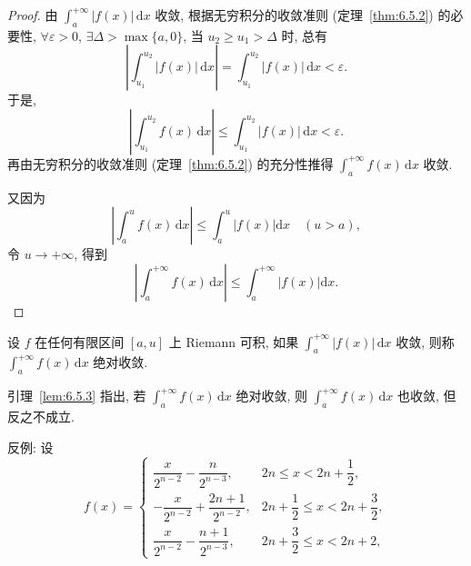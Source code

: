 \begin{proof}
由 $\int_{a}^{+\infty}|f(x)|\,\mathrm{d}x$ 收敛, 根据无穷积分的收敛准则 (定理~\ref{thm:6.5.2}) 的必要性, $\forall\varepsilon>0$, $\exists\Delta>\max\{a,0\}$, 当 $u_{2}\geqslant u_{1}>\Delta$ 时, 总有
\[
\left|\int_{u_{1}}^{u_{2}}|f(x)|\,\mathrm{d}x\right|=\int_{u_{1}}^{u_{2}}|f(x)|\,\mathrm{d}x<\varepsilon.
\]
于是,
\[
\left|\int_{u_{1}}^{u_{2}}f(x)\,\mathrm{d}x\right|\leqslant\int_{u_{1}}^{u_{2}}|f(x)|\,\mathrm{d}x<\varepsilon.
\]
再由无穷积分的收敛准则 (定理~\ref{thm:6.5.2}) 的充分性推得 $\int_{a}^{+\infty}f(x)\,\mathrm{d}x$ 收敛.

又因为
\[
\left|\int_{a}^{u}f(x)\,\mathrm{d}x\right|\leqslant\int_{a}^{u}\left|f(x)\right|\mathrm{d}x\quad(u>a),
\]
令 $u\to+\infty$, 得到
\[
\left|\int_{a}^{+\infty}f(x)\,\mathrm{d}x\right|\leqslant\int_{a}^{+\infty}\left|f(x)\right|\mathrm{d}x.
\]
\end{proof}

\begin{definition}\label{def:6.5.3}
设 $f$ 在任何有限区间 $[a,u]$ 上 Riemann 可积, 如果 $\int_{a}^{+\infty}|f(x)|\,\mathrm{d}x$ 收敛, 则称 $\int_{a}^{+\infty}f(x)\,\mathrm{d}x$ 绝对收敛.
\end{definition}

引理~\ref{lem:6.5.3} 指出, 若 $\int_{a}^{+\infty}f(x)\,\mathrm{d}x$ 绝对收敛, 则 $\int_{a}^{+\infty}f(x)\,\mathrm{d}x$ 也收敛, 但反之不成立.

反例: 设
\[
f(x)=\begin{cases}
\dfrac{x}{2^{n-2}}-\dfrac{n}{2^{n-3}}, & 2n\leqslant x<2n+\dfrac{1}{2},\\[3mm]
-\dfrac{x}{2^{n-2}}+\dfrac{2n+1}{2^{n-2}}, & 2n+\dfrac{1}{2}\leqslant x<2n+\dfrac{3}{2},\\[3mm]
\dfrac{x}{2^{n-2}}-\dfrac{n+1}{2^{n-3}}, & 2n+\dfrac{3}{2}\leqslant x<2n+2,
\end{cases}
\]

\begin{figure}[htbp]
\centering
{}
\caption{}\label{fig:6.5.4}
\end{figure}

